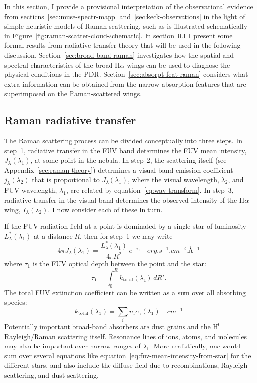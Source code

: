 \documentclass[useAMS, usenatbib, a4paper]{mnras}
\newcommand*\chem[1]{\ensuremath{\mathrm{#1}}}
\newcommand\ha{\ensuremath{\text{H}\alpha}}
\begin{document}
In this section, I provide a provisional interpretation
of the observational evidence
from sections~\ref{sec:muse-spectr-mapp} and~\ref{sec:keck-observations}
in the light of simple heuristic models of Raman scattering,
such as is illustrated schematically in Figure~\ref{fig:raman-scatter-cloud-schematic}.
In section~\ref{sec:raman-radi-transf} I present some formal results
from radiative transfer theory that will be used in the following discussion.
Section~\ref{sec:broad-band-raman} investigates
how the spatial and spectral
characteristics of the broad \ha{} wings can be used to diagnose
the physical conditions in the PDR.\@
Section~\ref{sec:absorpt-feat-raman} considers 
what extra information
can be obtained from the narrow absorption features that are superimposed on the
Raman-scattered wings.

\subsection{Raman radiative transfer}
\label{sec:raman-radi-transf}

The Raman scattering process can be divided conceptually into three steps.
In step~1, radiative transfer in the FUV band determines the FUV mean intensity,
\(J_\lambda(\lambda_1)\), at some point in the nebula.
In step~2, the scattering itself (see Appendix~\ref{sec:raman-theory})
determines a visual-band emission coefficient \(j_\lambda(\lambda_2)\)
that is proportional to \(J_\lambda(\lambda_1)\), where the
visual wavelength, \(\lambda_2\),
and FUV wavelength, \(\lambda_1\),
are related by equation~\eqref{eq:wav-transform}.
In step~3, radiative transfer in the visual band determines the
observed intensity of the \ha{} wing, \(I_\lambda (\lambda_2)\).
I now consider each of these in turn. 

If the FUV radiation field at a point is dominated by a single star
of luminosity \(L_\lambda^*(\lambda_1)\) at a distance \(R\), then for step~1 we may write
\begin{equation}
  \label{eq:fuv-mean-intensity-from-star}
  4\pi J_\lambda(\lambda_1) = \frac{L_\lambda^*(\lambda_1)}{4 \pi R^2} \, e^{-\tau_1}
  \quad \si{erg.s^{-1}.cm^{-2}.\angstrom^{-1}}
\end{equation}
where \(\tau_1\) is the FUV optical depth between the point and the star:
\begin{equation}
  \label{eq:tau-visual}
  \tau_1 = \int_0^R k_{\text{total}} (\lambda_1) \, dR'.
\end{equation}
The total FUV extinction coefficient can be written as a sum
over all absorbing species:
\begin{equation}
  \label{eq:k-fuv}
  k_{\text{total}} (\lambda_1) = \sum_i n_i \sigma_i(\lambda_1)
  \quad \si{cm^{-1}} 
\end{equation}
Potentially important broad-band absorbers are dust grains
and the \chem{H^0} Rayleigh/Raman scattering itself.
Resonance lines of ions, atoms, and molecules may also be important
over narrow ranges of \(\lambda_1\).
More realistically, one would sum over several equations like equation~\eqref{eq:fuv-mean-intensity-from-star} for the different stars,
and also include the diffuse field due to recombinations, Rayleigh scattering,
and dust scattering.
\end{document}
